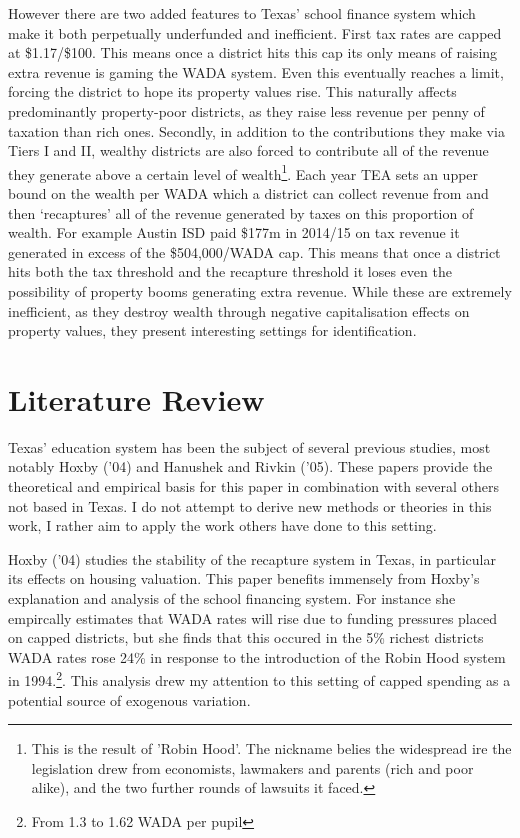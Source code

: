 \documentclass[11pt]{article}
\begin{document}
However there are two added features to Texas’ school finance system which make it both perpetually underfunded and inefficient. First tax rates are capped at \$1.17/\$100. This means once a district hits this cap its only means of raising extra revenue is gaming the WADA system. Even this eventually reaches a limit, forcing the district to hope its property values rise. This naturally affects predominantly property-poor districts, as they raise less revenue per penny of taxation than rich ones. Secondly, in addition to the contributions they make via Tiers I and II, wealthy districts are also forced to contribute all of the revenue they generate above a certain level of wealth\footnote{This is the result of 'Robin Hood'. The nickname belies the widespread ire the legislation drew from economists, lawmakers and parents (rich and poor alike), and the two further rounds of lawsuits it faced.}. Each year TEA sets an upper bound on the wealth per WADA which a district can collect revenue from and then ‘recaptures’ all of the revenue generated by taxes on this proportion of wealth. For example Austin ISD paid \$177m in 2014/15 on tax revenue it generated in excess of the \$504,000/WADA cap. This means that once a district hits both the tax threshold and the recapture threshold it loses even the possibility of property booms generating extra revenue. While these are extremely inefficient, as they destroy wealth through negative capitalisation effects on property values, they present interesting settings for identification. 


\section{Literature Review}
\label{s:next}

Texas' education system has been the subject of several previous studies, most notably Hoxby ('04) and Hanushek and Rivkin ('05). These papers provide the theoretical and empirical basis for this paper in combination with several others not based in Texas. I do not attempt to derive new methods or theories in this work, I rather aim to apply the work others have done to this setting. 

Hoxby (’04) studies the stability of the recapture system in Texas, in particular its effects on housing valuation. This paper benefits immensely from Hoxby's explanation and analysis of the school financing system. For instance she empircally estimates that WADA rates will rise due to funding pressures placed on capped districts, but she finds that this occured in the 5\% richest districts WADA rates rose 24\% in response to the introduction of the Robin Hood system in 1994.\footnote{From 1.3 to 1.62 WADA per pupil}. This analysis drew my attention to this setting of capped spending as a potential source of exogenous variation. 
\end{document}
